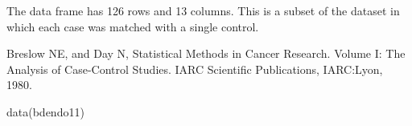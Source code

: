 \begin{Description}\relax
The  data frame has 126 rows and 13 columns.
This is a subset of the dataset  in which each case
was matched with a single control.
\end{Description}
\begin{Source}\relax
Breslow NE, and Day N, Statistical Methods in Cancer Research. Volume
I: The Analysis of Case-Control Studies. IARC Scientific
Publications, IARC:Lyon, 1980.
\end{Source}
\begin{Examples}
\begin{ExampleCode}
data(bdendo11)
\end{ExampleCode}
\end{Examples}

